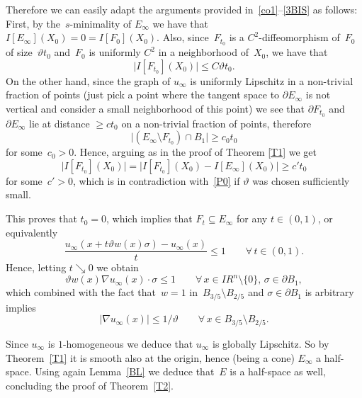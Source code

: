 \documentclass[11pt]{amsart}
\begin{document}
Therefore
we can easily adapt the arguments provided in~\eqref{co1}--\eqref{3BIS} as follows:
First, by the~$s$-minimality of $E_\infty$ we have that~$I[E_\infty](X_0)=0=I[F_0](X_0)$.
Also, since~$F_{t_0}$ is a $C^2$-diffeomorphism of~$F_0$ of size~${\vartheta} t_0$
and~$F_{0}$ is uniformly $C^2$ in a neighborhood of~$X_0$, we have that
\begin{equation}\label{P0}
\bigl| I[F_{t_0}](X_0) \bigr| {\leqslant} C{\vartheta} t_0.
\end{equation}
On the other hand, since the graph of $u_\infty$ is uniformly Lipschitz in a non-trivial fraction of points
(just pick a point where the tangent space to $\partial E_\infty$ is not vertical and consider a small neighborhood of this point)
we see that $\partial F_{t_0}$ and $\partial E_\infty$ lie at distance ${\geqslant} ct_0$ on a non-trivial fraction of points,
therefore
$$ \big| (E_\infty\setminus F_{t_0}) \cap B_1\big|{\geqslant} c_0 t_0$$
for some~$c_0>0$. Hence, arguing as in the proof of Theorem \ref{T1} we get
$$ \bigl| I[F_{t_0}](X_0)\bigr|=
\bigl| I[F_{t_0}](X_0)-I[E_\infty](X_0) \bigr| {\geqslant} c't_0
$$
for some~$c'>0$, which is in contradiction with~\eqref{P0}
if ${\vartheta}$ was chosen sufficiently small.

This proves that $t_0=0$, which implies that $F_t\subseteq E_\infty$ for any $t \in (0,1)$, or equivalently
$$ \frac{u_\infty(x+t{\vartheta} w(x)\sigma)-u_\infty(x)}{t}{\leqslant} 1
\qquad \forall \,t \in (0,1).$$
Hence, letting $t \searrow 0$ we obtain
$$
{\vartheta} w(x)\nabla u_\infty(x)\cdot \sigma{\leqslant}1\qquad \forall\,x\in{{I\!\!R}}^n\setminus\{0\},\,\sigma\in\partial B_1,
$$
which combined with the fact that~$w=1$ in~$B_{3/5}\setminus B_{2/5}$ and $\sigma \in \partial B_1$
is arbitrary implies
$$
|\nabla u_\infty(x)|{\leqslant}1/{\vartheta}\qquad \forall\,x\in
B_{3/5}\setminus B_{2/5}.
$$

Since $u_\infty$ is $1$-homogeneous we deduce that $u_\infty$ is globally Lipschitz.
So by Theorem~\ref{T1} it is smooth also at the origin, hence (being a cone) $E_\infty$ a half-space.
Using again Lemma~\ref{BL}
we deduce that~$E$ is a half-space as well, 
concluding the proof of Theorem~\ref{T2}.
\end{document}

